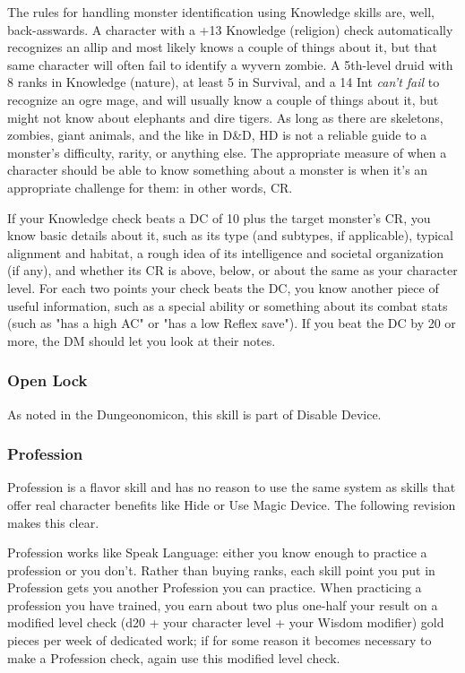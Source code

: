 The rules for handling monster identification using Knowledge skills are, well, back-asswards. A character with a +13 Knowledge (religion) check automatically recognizes an allip and most likely knows a couple of things about it, but that same character will often fail to identify a wyvern zombie. A 5th-level druid with 8 ranks in Knowledge (nature), at least 5 in Survival, and a 14 Int \textit{can't fail} to recognize an ogre mage, and will usually know a couple of things about it, but might not know about elephants and dire tigers. As long as there are skeletons, zombies, giant animals, and the like in D\&D, HD is not a reliable guide to a monster's difficulty, rarity, or anything else. The appropriate measure of when a character should be able to know something about a monster is when it's an appropriate challenge for them: in other words, CR.

If your Knowledge check beats a DC of 10 plus the target monster's CR, you know basic details about it, such as its type (and subtypes, if applicable), typical alignment and habitat, a rough idea of its intelligence and societal organization (if any), and whether its CR is above, below, or about the same as your character level. For each two points your check beats the DC, you know another piece of useful information, such as a special ability or something about its combat stats (such as "has a high AC" or "has a low Reflex save"). If you beat the DC by 20 or more, the DM should let you look at their notes.

\subsubsection{Open Lock}

As noted in the Dungeonomicon, this skill is part of Disable Device.

\subsubsection{Profession}

Profession is a flavor skill and has no reason to use the same system as skills that offer real character benefits like Hide or Use Magic Device. The following revision makes this clear.

Profession works like Speak Language: either you know enough to practice a profession or you don't. Rather than buying ranks, each skill point you put in Profession gets you another Profession you can practice. When practicing a profession you have trained, you earn about two plus one-half your result on a modified level check (d20 + your character level + your Wisdom modifier) gold pieces per week of dedicated work; if for some reason it becomes necessary to make a Profession check, again use this modified level check.


